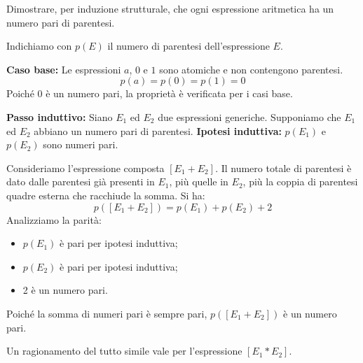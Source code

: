 \begin{esempio}
    Dimostrare, per induzione strutturale, che ogni espressione aritmetica ha un numero pari di parentesi.

Indichiamo con \( p(E) \) il numero di parentesi dell'espressione \( E \).
    
    \textbf{Caso base:} Le espressioni \( a \), \( 0 \) e \( 1 \) sono atomiche e non contengono parentesi.
    \[
    p(a) = p(0) = p(1) = 0
    \]
    Poiché 0 è un numero pari, la proprietà è verificata per i casi base.

    \textbf{Passo induttivo:} Siano \( E_1 \) ed \( E_2 \) due espressioni generiche.
    Supponiamo che \( E_1 \) ed \( E_2 \) abbiano un numero pari di parentesi.
    \textbf{Ipotesi induttiva:} \( p(E_1) \) e \( p(E_2) \) sono numeri pari.
    
    Consideriamo l'espressione composta \( [E_1 + E_2] \). Il numero totale di parentesi è dato dalle parentesi già presenti in \( E_1 \), più quelle in \( E_2 \), più la coppia di parentesi quadre esterna che racchiude la somma. Si ha:
    \[
    p([E_1 + E_2]) = p(E_1) + p(E_2) + 2
    \]
    Analizziamo la parità:
    \begin{itemize}
        \item \( p(E_1) \) è pari per ipotesi induttiva;
        \item \( p(E_2) \) è pari per ipotesi induttiva;
        \item 2 è un numero pari.
    \end{itemize}
    Poiché la somma di numeri pari è sempre pari, \( p([E_1 + E_2]) \) è un numero pari.
    
    Un ragionamento del tutto simile vale per l'espressione \( [E_1 * E_2] \).
\end{esempio}












